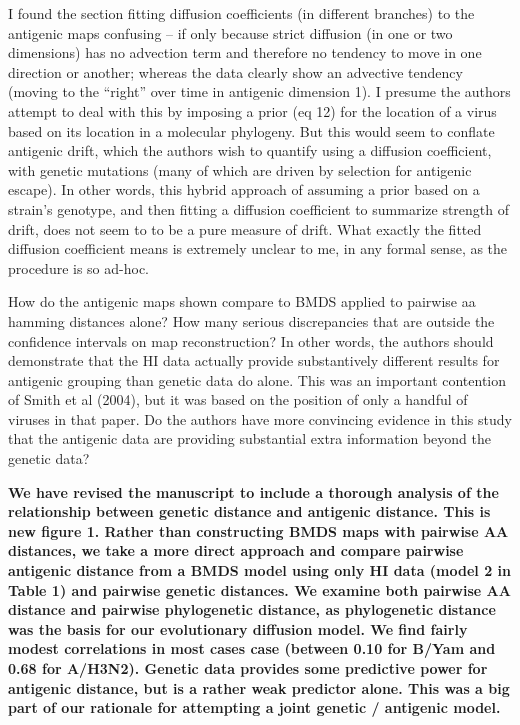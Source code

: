 \documentclass[11pt,oneside,letterpaper]{article}
\begin{document}
I found the section fitting diffusion coefficients (in different branches) to the antigenic maps confusing -- if only because strict diffusion (in one or two dimensions) has no advection term and therefore no tendency to move in one direction or another; whereas the data clearly show an advective tendency (moving to the ``right'' over time in antigenic dimension 1). I presume the authors attempt to deal with this by imposing a prior (eq 12) for the location of a virus based on its location in a molecular phylogeny. But this would seem to conflate antigenic drift, which the authors wish to quantify using a diffusion coefficient, with genetic mutations (many of which are driven by selection for antigenic escape). In other words, this hybrid approach of assuming a prior based on a strain's genotype, and then fitting a diffusion coefficient to summarize strength of drift, does not seem to to be a pure measure of drift. What exactly the fitted diffusion coefficient means is extremely unclear to me, in any formal sense, as the procedure is so ad-hoc.

How do the antigenic maps shown compare to BMDS applied to pairwise aa hamming distances alone? How many serious discrepancies that are outside the confidence intervals on map reconstruction? In other words, the authors should demonstrate that the HI data actually provide substantively different results for antigenic grouping than genetic data do alone. This was an important contention of Smith et al (2004), but it was based on the position of only a handful of viruses in that paper. Do the authors have more convincing evidence in this study that the antigenic data are providing substantial extra information beyond the genetic data?

\textbf{We have revised the manuscript to include a thorough analysis of the relationship between genetic distance and antigenic distance.  This is new figure 1.  Rather than constructing BMDS maps with pairwise AA distances, we take a more direct approach and compare pairwise antigenic distance from a BMDS model using only HI data (model 2 in Table 1) and pairwise genetic distances.  We examine both pairwise AA distance and pairwise phylogenetic distance, as phylogenetic distance was the basis for our evolutionary diffusion model.  We find fairly modest correlations in most cases case (between 0.10 for B/Yam and 0.68 for A/H3N2).  Genetic data provides some predictive power for antigenic distance, but is a rather weak predictor alone.  This was a big part of our rationale for attempting a joint genetic / antigenic model.}
\end{document}
